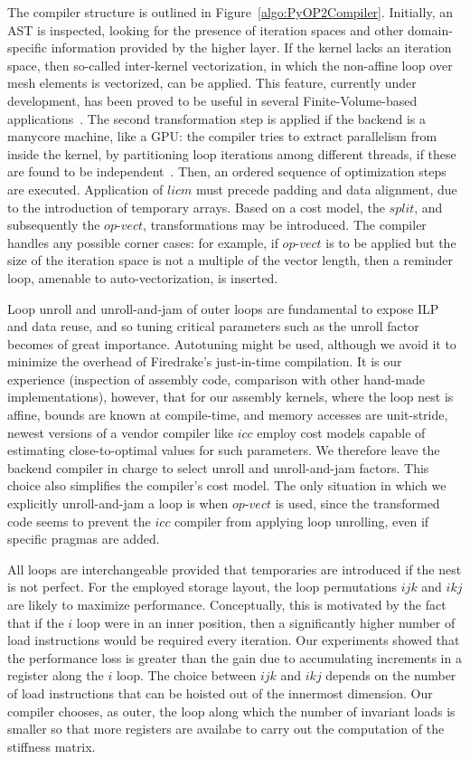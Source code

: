 \documentclass[conference]{IEEEtran}
\begin{document}
The compiler structure is outlined in Figure~\ref{algo:PyOP2Compiler}. Initially, an AST is inspected, looking for the presence of iteration spaces and other domain-specific information provided by the higher layer. If the kernel lacks an iteration space, then so-called inter-kernel vectorization, in which the non-affine loop over mesh elements is vectorized, can be applied. This feature, currently under development, has been proved to be useful in several Finite-Volume-based applications~\cite{reguly-inter-kernel}. The second transformation step is applied if the backend is a manycore machine, like a GPU: the compiler tries to extract parallelism from inside the kernel, by partitioning loop iterations among different threads, if these are found to be independent~\cite{quadrature-cuda}. Then, an ordered sequence of optimization steps are executed. Application of $licm$ must precede padding and data alignment, due to the introduction of temporary arrays. Based on a cost model, the $split$, and subsequently the $op$-$vect$, transformations may be introduced. The compiler handles any possible corner cases: for example, if $op$-$vect$ is to be applied but the size of the iteration space is not a multiple of the vector length, then a reminder loop, amenable to auto-vectorization, is inserted. 

Loop unroll and unroll-and-jam of outer loops are fundamental to expose ILP and data reuse, and so tuning critical parameters such as the unroll factor becomes of great importance. Autotuning might be used, although we avoid it to minimize the overhead of Firedrake's just-in-time compilation. It is our experience (inspection of assembly code, comparison with other hand-made implementations), however, that for our assembly kernels, where the loop nest is affine, bounds are known at compile-time, and memory accesses are unit-stride, newest versions of a vendor compiler like $icc$ employ cost models capable of estimating close-to-optimal values for such parameters.  We therefore leave the backend compiler in charge to select unroll and unroll-and-jam factors. This choice also simplifies the compiler's cost model. The only situation in which we explicitly unroll-and-jam a loop is when $op$-$vect$ is used, since the transformed code seems to prevent the $icc$ compiler from applying loop unrolling, even if specific pragmas are added.

All loops are interchangeable provided that temporaries are introduced if the nest is not perfect. For the employed storage layout, the loop permutations $ijk$ and $ikj$ are likely to maximize performance. Conceptually, this is motivated by the fact that if the $i$ loop were in an inner position, then a significantly higher number of load instructions would be required every iteration. Our experiments showed that the performance loss is greater than the gain due to accumulating increments in a register along the $i$ loop. The choice between $ijk$ and $ikj$ depends on the number of load instructions that can be hoisted out of the innermost dimension. Our compiler chooses, as outer, the loop along which the number of invariant loads is smaller so that more registers are availabe to carry out the computation of the stiffness matrix. 
\end{document}
